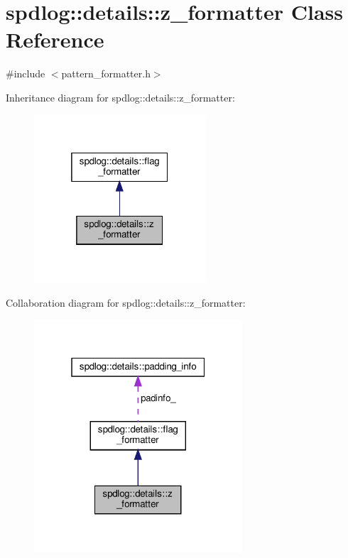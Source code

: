 \hypertarget{classspdlog_1_1details_1_1z__formatter}{}\section{spdlog\+:\+:details\+:\+:z\+\_\+formatter Class Reference}
\label{classspdlog_1_1details_1_1z__formatter}


{\ttfamily \#include $<$pattern\+\_\+formatter.\+h$>$}



Inheritance diagram for spdlog\+:\+:details\+:\+:z\+\_\+formatter\+:
\nopagebreak
\begin{figure}[H]
\begin{center}
\leavevmode
\includegraphics[width=181pt]{classspdlog_1_1details_1_1z__formatter__inherit__graph}
\end{center}
\end{figure}


Collaboration diagram for spdlog\+:\+:details\+:\+:z\+\_\+formatter\+:
\nopagebreak
\begin{figure}[H]
\begin{center}
\leavevmode
\includegraphics[width=220pt]{classspdlog_1_1details_1_1z__formatter__coll__graph}
\end{center}
\end{figure}
